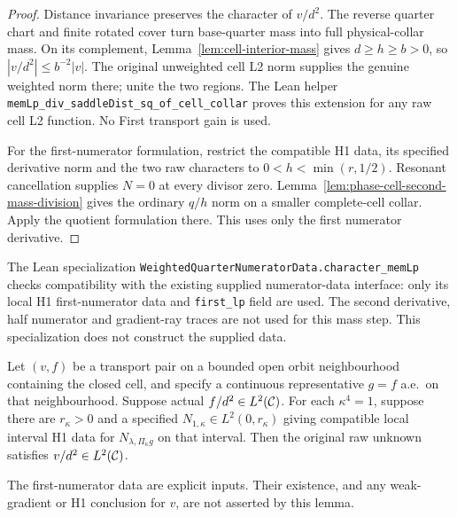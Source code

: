\begin{proof}
\leanok
Distance invariance preserves the character of $v/d^2$.
The reverse quarter chart and finite rotated cover turn base-quarter
mass into full physical-collar mass.
On its complement, Lemma~\ref{lem:cell-interior-mass} gives
$d\ge h\ge b>0$, so $|v/d^2|\le b^{-2}|v|$.
The original unweighted cell L2 norm supplies the genuine weighted norm
there; unite the two regions. The Lean helper
\texttt{memLp\_div\_saddleDist\_sq\_of\_cell\_collar} proves this extension
for any raw cell L2 function. No First transport gain is used.

For the first-numerator formulation, restrict the compatible H1 data,
its specified derivative norm and the two raw characters to
$0<h<\min(r,1/2)$.
Resonant cancellation supplies $N=0$ at every divisor zero.
Lemma~\ref{lem:phase-cell-second-mass-division} gives the ordinary
$q/h$ norm on a smaller complete-cell collar. Apply the quotient formulation
there. This uses only the first numerator derivative.
\end{proof}

\begin{remark}
The Lean specialization
\texttt{WeightedQuarterNumeratorData.character\_memLp} checks compatibility
with the existing supplied numerator-data interface: only its local H1
first-numerator data and \texttt{first\_lp} field are used.
The second derivative, half numerator and gradient-ray traces are not used
for this mass step. This specialization does not construct the supplied data.
\end{remark}

\begin{lemma}
\label{lem:weighted-transport-mass-data}
\leanok
Let $(v,f)$ be a transport pair on a bounded open orbit neighbourhood
containing the closed cell, and specify a continuous representative $g=f$
a.e.\ on that neighbourhood. Suppose actual $f/d^2\in L^2(\mathcal{C})$.
For each $\kappa^4=1$, suppose there are $r_\kappa>0$ and a specified
$N_{1,\kappa}\in L^2(0,r_\kappa)$ giving compatible local interval H1
data for $N_{\lambda,\Pi_\kappa g}$ on that interval.
Then the original raw unknown satisfies $v/d^2\in L^2(\mathcal{C})$.

The first-numerator data are explicit inputs. Their existence, and any
weak-gradient or H1 conclusion for $v$, are not asserted by this lemma.
\end{lemma}

